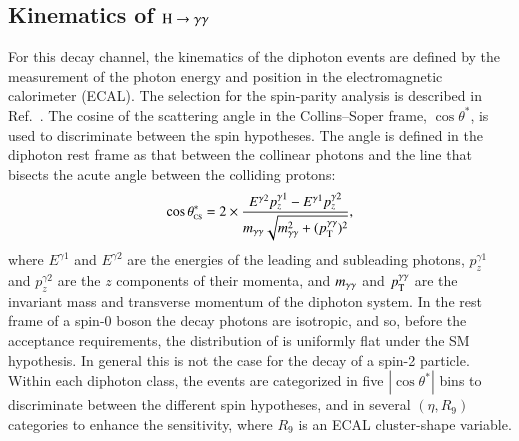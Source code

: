 \subsection{Kinematics of $\mathrm{H}\to\gamma\gamma$}
\label{sec:hggkinematics}

For this decay channel, the kinematics of the diphoton events are
defined by the measurement of the photon energy and position in the
electromagnetic calorimeter (ECAL). The selection for the spin-parity
analysis is described in Ref.~\cite{Khachatryan:2014ira}. The cosine
of the scattering angle in the Collins--Soper frame, $\cos\theta^*$,
is used to discriminate between the spin hypotheses.  The angle is
defined in the diphoton rest frame as that between the collinear
photons and the line that bisects the acute angle between the
colliding protons:
%
\begin{equation}
  \cos\theta^{\ast}_{\mbox{\tiny{CS}}}=2\times\frac{E^{\gamma2}p^{\gamma1}_{z}-E^{\gamma1}p^{\gamma2}_{z}}{m_{\gamma\gamma}\sqrt{m_{\gamma\gamma}^{2}+(p_{\mathrm{T}}^{\gamma\gamma})^{2}}},
\end{equation}
%
where $E^{\gamma1}$ and $E^{\gamma2}$ are the energies of the leading
and subleading photons, $p^{\gamma1}_{z}$ and $p^{\gamma2}_{z}$ are
the $z$ components of their momenta, and $m_{\gamma\gamma}$ and $p_{\mathrm{T}}^{\gamma\gamma}$ are the
invariant mass and transverse momentum of the diphoton system.  In the
rest frame of a spin-0 boson the decay photons are isotropic, and so,
before the acceptance requirements, the distribution of \costhetastar
is uniformly flat under the SM hypothesis.  In general this is not the
case for the decay of a spin-2 particle.  Within each diphoton class,
the events are categorized in five $|\cos\theta^*|$ bins to
discriminate between the different spin hypotheses, and in several
$(\eta, R_9)$ categories to enhance the sensitivity, where $R_9$ is an
ECAL cluster-shape variable.
%

